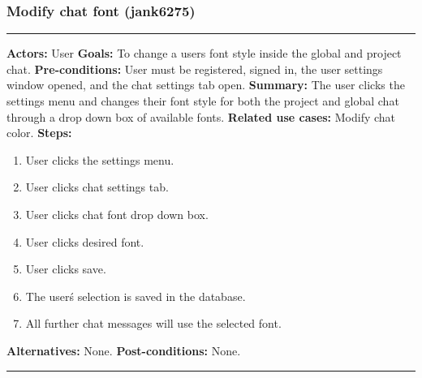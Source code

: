 \documentclass[11pt]{report}
\begin{document}
\subsubsection{Modify chat font (jank6275)}
\vspace{2pt}
\hrule
\vspace{8pt}
 \textbf{Actors:} User \newline
\textbf{Goals:} To change a users font style inside the global and project chat. \newline
 \textbf{Pre-conditions:} User must be registered, signed in, the user settings window opened, and the chat settings tab open.  \newline
 \textbf{Summary:} The user clicks the settings menu and changes their font style for both the project and global chat through a drop down box of available fonts. \newline
\textbf{Related use cases:} Modify chat color. \newline
\textbf{Steps:} \begin{enumerate}
  \item User clicks the settings menu.
  \item User clicks chat settings tab.
  \item User clicks chat font drop down box.
  \item User clicks desired font.
  \item User clicks save.
  \item The user\'s selection is saved in the database.
  \item All further chat messages will use the selected font.
 \end{enumerate}
 \textbf{Alternatives:} None. \newline
 \textbf{Post-conditions:} None. \newline
\vspace{8pt}
\hrule
\newpage
\end{document}
